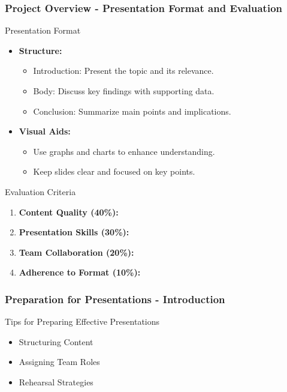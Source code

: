 \documentclass[aspectratio=169]{beamer}
\begin{document}
\begin{frame}[fragile]
    \frametitle{Project Overview - Presentation Format and Evaluation}
    \begin{block}{Presentation Format}
        \begin{itemize}
            \item \textbf{Structure:}
                \begin{itemize}
                    \item Introduction: Present the topic and its relevance.
                    \item Body: Discuss key findings with supporting data.
                    \item Conclusion: Summarize main points and implications.
                \end{itemize}
    
            \item \textbf{Visual Aids:}
                \begin{itemize}
                    \item Use graphs and charts to enhance understanding.
                    \item Keep slides clear and focused on key points.
                \end{itemize}
        \end{itemize}
    \end{block}

    \begin{block}{Evaluation Criteria}
        \begin{enumerate}
            \item \textbf{Content Quality (40\%):}
            \item \textbf{Presentation Skills (30\%):}
            \item \textbf{Team Collaboration (20\%):}
            \item \textbf{Adherence to Format (10\%):}
        \end{enumerate}
    \end{block}
\end{frame}

\begin{frame}[fragile]
    \frametitle{Preparation for Presentations - Introduction}
    \begin{block}{Tips for Preparing Effective Presentations}
        \begin{itemize}
            \item Structuring Content
            \item Assigning Team Roles
            \item Rehearsal Strategies
        \end{itemize}
    \end{block}
\end{frame}
\end{document}
